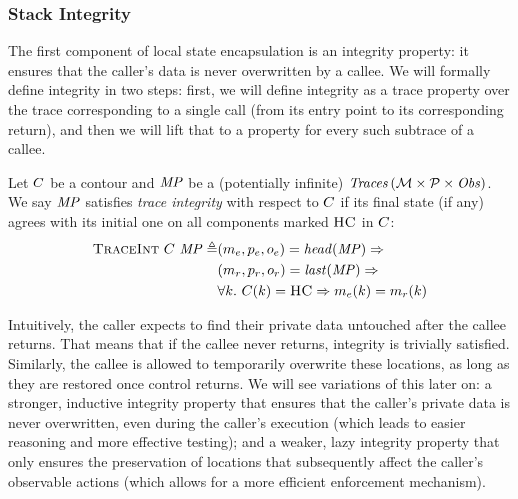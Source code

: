 \documentclass[acmsmall,review,anonymous]{acmart}\settopmatter{printfolios=true,printccs=false,printacmref=false}
\begin{document}
{%


\subsubsection{Stack Integrity}

The first component of local state encapsulation is an integrity
property: it ensures that the caller's data is never overwritten by a
callee. We will formally define integrity in two steps: first, we will
define integrity as a trace property over the trace corresponding to a
single call (from its entry point to its corresponding return), and
then we will lift that to a property for every such subtrace of a
callee.


Let \(C\) be a contour and \(\mathit{MP}\) be a (potentially infinite)
\(\mathit{Traces}\,({\mathcal M} \times \mathcal{P} \times \mathit{Obs})\). We say \(\mathit{MP}\) satisfies {\em trace integrity} with
respect to \(C\) if its final state (if any) agrees with its
initial one on all components marked \(\textsc{HC}\) in \(C\):
%
\[\begin{split}
  \text{\sc TraceInt} ~ C ~ \mathit{MP} \triangleq &
    (m_e,p_e,o_e) = \mathit{head}(\mathit{MP}) \Rightarrow \\
  & (m_r,p_r,o_r) = \mathit{last}(\mathit{MP}) \Rightarrow \\
  & \forall k. ~ C(k) = \textsc{HC} \Rightarrow
    m_e(k) = m_r(k) \\
\end{split}\]

Intuitively, the caller expects to find their private data untouched
after the callee returns. That means that if the callee never returns,
integrity is trivially satisfied. Similarly, the callee is allowed to
temporarily overwrite these locations, as long as they are restored
once control returns. We will see variations of this later on: a
stronger, inductive integrity property that ensures that the caller's
private data is never overwritten, even during the caller's execution
(which leads to easier reasoning and more effective testing);
and a weaker, lazy integrity property that only ensures the preservation
of locations that subsequently affect the caller's observable actions
(which allows for a more efficient enforcement mechanism).

}
\end{document}
